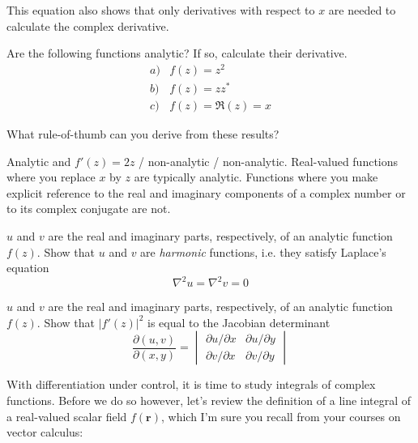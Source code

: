 This equation also shows that only derivatives with respect to $x$ are needed to calculate the complex derivative.


\begin{exer}
Are the following functions analytic? If so, calculate their derivative.
$$\begin{array}{lcll}a) & f(z)=z^2 \\b) & f(z)=z z^* \\c) & f(z)= \Re(z)=x \end{array}$$

What rule-of-thumb can you derive from these results?

\begin{sol}
Analytic and $f'(z)=2z$ / non-analytic / non-analytic. Real-valued functions where you replace $x$ by $z$ are typically analytic. Functions where you make explicit reference to the real and imaginary components of a complex number or to its complex conjugate are not.
\end{sol}
  
\end{exer}

\begin{exer}
\label{ex-harmonic}
$u$ and $v$ are the real and imaginary parts, respectively, of an analytic function $f(z)$. Show that $u$ and $v$ are \emph{harmonic} functions, i.e. they satisfy Laplace's equation
$$\nabla^2 u = \nabla^2 v = 0$$
\end{exer}

\begin{exer}
$u$ and $v$ are the real and imaginary parts, respectively, of an analytic function $f(z)$. Show that $|f'(z)|^2$ is equal to the Jacobian determinant
$$\frac{\partial (u,v)}{\partial (x,y)} =  \begin{vmatrix} \partial u / \partial x & \partial u / \partial y \\ \partial v / \partial x & \partial v / \partial y \end{vmatrix}$$
\end{exer}


\pagebreak



With differentiation under control, it is time to study integrals of complex functions. Before we do so however, let's review the definition of a line integral of a real-valued scalar field $f(\mathbf{r})$, which I'm sure you recall from your courses on vector calculus:

